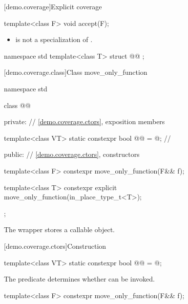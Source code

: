 [demo.coverage]{Explicit coverage}

%
\begin{itemdecl}
template<class F>
  void accept(F);
\end{itemdecl}

\begin{itemdescr}
\pnum
\constraints
\begin{itemize}
\item {} is not a specialization of .
\end{itemize}
\end{itemdescr}

\begin{codeblock}
namespace std {
  template<class T>
  struct @@ {};
}
\end{codeblock}

[demo.coverage.class]{Class move_only_function}

\begin{codeblock}
namespace std {
  class @@ {
  private:
    // \ref{demo.coverage.ctors}, exposition members

    template<class VT>
    static constexpr bool @@ = @\seebelow@; // \expos

  public:
    // \ref{demo.coverage.ctors}, constructors

    template<class F> constexpr move_only_function(F&& f);

    template<class T> constexpr explicit move_only_function(in_place_type_t<T>);
  };
}
\end{codeblock}

\pnum
The wrapper stores a callable object.

[demo.coverage.ctors]{Construction}

\begin{itemdecl}
template<class VT>
  static constexpr bool @@ = @\seebelow@;
\end{itemdecl}

\begin{itemdescr}
\pnum
The predicate determines whether  can be invoked.
\end{itemdescr}

%
\begin{itemdecl}
template<class F>
  constexpr move_only_function(F&& f);
\end{itemdecl}

